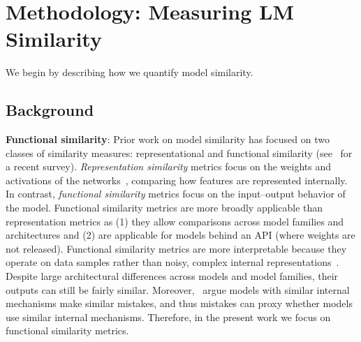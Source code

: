 \section{Methodology: Measuring LM Similarity}
\label{sec:method}
We begin by describing how we quantify model similarity.

\subsection{Background}

\textbf{Functional similarity}: Prior work on model similarity has focused on two classes of similarity measures: representational and functional similarity (see~\citet{klabunde2024similarityneuralnetworkmodels} for a recent survey). \textit{Representation similarity} metrics focus on the weights and activations of the networks~\citep{kornblith2019similarity}, comparing how features are represented internally. In contrast, \textit{functional similarity} metrics focus on the input–output behavior of the model. 
Functional similarity metrics are more broadly applicable than representation metrics as (1) they allow comparisons across model families and architectures and (2) are applicable for models behind an API (where weights are not released). Functional similarity metrics are more interpretable because they operate on data samples rather than noisy, complex internal representations~\citep{golechha2024challenges}. Despite large architectural differences across models and model families, their outputs can still be fairly similar. Moreover,~\citet{geirhos2020beyond} argue models with similar internal mechanisms make similar mistakes, and thus mistakes can proxy whether models use similar internal mechanisms. Therefore, in the present work we focus on functional similarity metrics.

